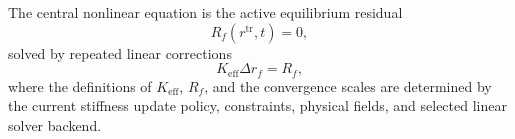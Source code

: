 \documentclass[11pt,a4paper]{article}
\begin{document}
The central nonlinear equation is the active equilibrium residual
\[
  R_f(r^{\mathrm{tr}}, t) = 0,
\]
solved by repeated linear corrections
\[
  K_{\mathrm{eff}} \Delta r_f = R_f,
\]
where the definitions of \(K_{\mathrm{eff}}\), \(R_f\), and the convergence
scales are determined by the current stiffness update policy, constraints,
physical fields, and selected linear solver backend.
\end{document}
